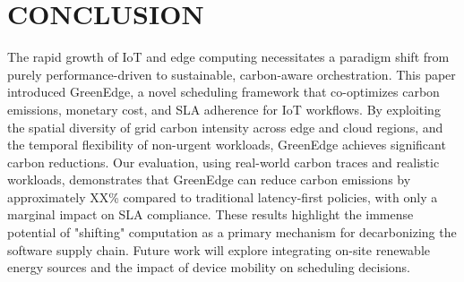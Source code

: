 \documentclass[lettersize,journal]{IEEEtran}
\begin{document}
\section{CONCLUSION}
\label{sec:conclusion}
The rapid growth of IoT and edge computing necessitates a paradigm shift from purely performance-driven to sustainable, carbon-aware orchestration. This paper introduced GreenEdge, a novel scheduling framework that co-optimizes carbon emissions, monetary cost, and SLA adherence for IoT workflows. By exploiting the spatial diversity of grid carbon intensity across edge and cloud regions, and the temporal flexibility of non-urgent workloads, GreenEdge achieves significant carbon reductions.
Our evaluation, using real-world carbon traces and realistic workloads, demonstrates that GreenEdge can reduce carbon emissions by approximately XX\% compared to traditional latency-first policies, with only a marginal impact on SLA compliance. These results highlight the immense potential of "shifting" computation as a primary mechanism for decarbonizing the software supply chain. Future work will explore integrating on-site renewable energy sources and the impact of device mobility on scheduling decisions.




\end{document}
